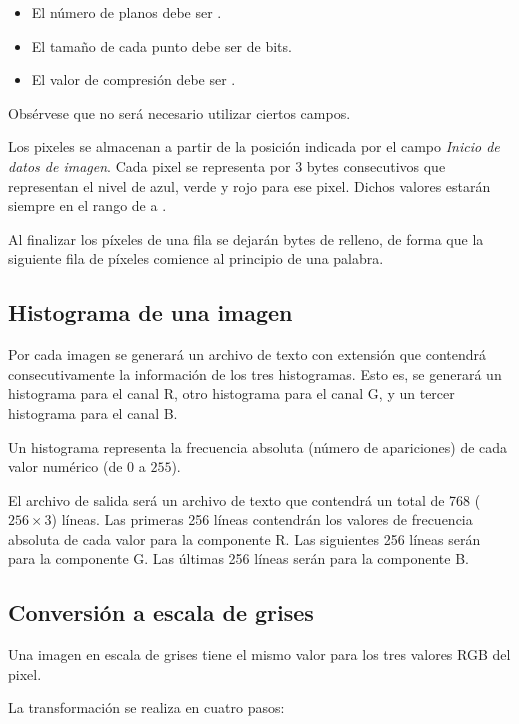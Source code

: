 \begin{itemize}
\item El número de planos debe ser .
\item El tamaño de cada punto debe ser de  bits.
\item El valor de compresión debe ser .
\end{itemize}

Obsérvese que no será necesario utilizar ciertos campos.

Los pixeles se almacenan a partir de la posición indicada por el campo
\emph{Inicio de datos de imagen}. Cada pixel se representa por 3 bytes
consecutivos que representan el nivel de azul, verde y rojo para ese
pixel. Dichos valores estarán siempre en el rango de  a
.

Al finalizar los píxeles de una fila se dejarán bytes de relleno, de forma
que la siguiente fila de píxeles comience al principio de una palabra.

\subsection{Histograma de una imagen}

Por cada imagen se generará un archivo de texto con extensión 
que contendrá consecutivamente la información de los tres histogramas.
Esto es, se generará un histograma para el canal R, otro histograma para
el canal G, y un tercer histograma para el canal B.

Un histograma representa la frecuencia absoluta (número de apariciones) de 
cada valor numérico (de $0$ a $255$).

El archivo de salida será un archivo de texto que contendrá 
un total de 768 ($256 \times 3$) líneas.
Las primeras 256 líneas contendrán los valores de frecuencia absoluta de cada
valor para la componente R. Las siguientes 256 líneas serán para la componente
G. Las últimas 256 líneas serán para la componente B.

\subsection{Conversión a escala de grises}

Una imagen en escala de grises tiene el mismo valor para los tres valores RGB del pixel.

La transformación se realiza en cuatro pasos:

